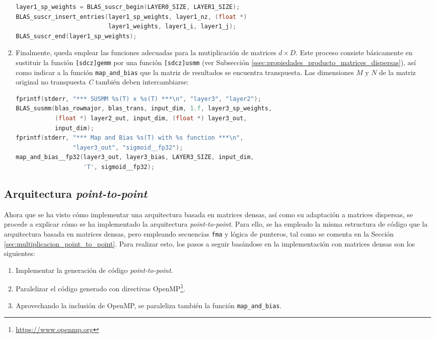 \begin{enumerate}
\begin{lstlisting}[language=C]
layer1_sp_weights = BLAS_suscr_begin(LAYER0_SIZE, LAYER1_SIZE);
BLAS_suscr_insert_entries(layer1_sp_weights, layer1_nz, (float *)
                          layer1_weights, layer1_i, layer1_j);
BLAS_suscr_end(layer1_sp_weights);
\end{lstlisting}

    \item Finalmente, queda emplear las funciones adecuadas para la mutiplicación de matrices $d\times D$. Este proceso consiste básicamente en sustituir la función \texttt{[sdcz]gemm} por una función \texttt{[sdcz]usmm} (ver Subsección \ref{ssec:propiedades_producto_matrices_dispersas}), así como indicar a la función \texttt{map\_and\_bias} que la matriz de resultados se encuentra transpuesta. Las dimensiones $M$ y $N$ de la matriz original no transpuesta \textit{C} también deben intercambiarse:\medskip
\begin{lstlisting}[language=C]
fprintf(stderr, "*** SUSMM %s(T) x %s(T) ***\n", "layer3", "layer2");
BLAS_susmm(blas_rowmajor, blas_trans, input_dim, 1.f, layer3_sp_weights,
           (float *) layer2_out, input_dim, (float *) layer3_out,
           input_dim);
fprintf(stderr, "*** Map and Bias %s(T) with %s function ***\n",
                "layer3_out", "sigmoid__fp32");
map_and_bias__fp32(layer3_out, layer3_bias, LAYER3_SIZE, input_dim,
                   'T', sigmoid__fp32);
\end{lstlisting}
\end{enumerate}

\subsection{Arquitectura \textit{point-to-point}}
\label{ssec:gdin_arquitectura_point_to_point}
Ahora que se ha visto cómo implementar una arquitectura basada en matrices densas, así como su adaptación a matrices dispersas, se procede a explicar cómo se ha implementado la arquitectura \textit{point-to-point}. Para ello, se ha empleado la misma estructura de código que la arquitectura basada en matrices densas, pero empleando secuencias \texttt{\acrshort{fma}} y lógica de punteros, tal como se comenta en la Sección \ref{sec:multiplicacion_point_to_point}. Para realizar esto, los pasos a seguir basándose en la implementación con matrices densas son los siguientes:

\begin{enumerate}
    \item Implementar la generación de código \textit{point-to-point}.
    \item Paralelizar el código generado con directivas OpenMP\footnote{\url{https://www.openmp.org}}.
    \item Aprovechando la inclusión de OpenMP, se paraleliza también la función \texttt{map\_and\_bias}.
\end{enumerate}

